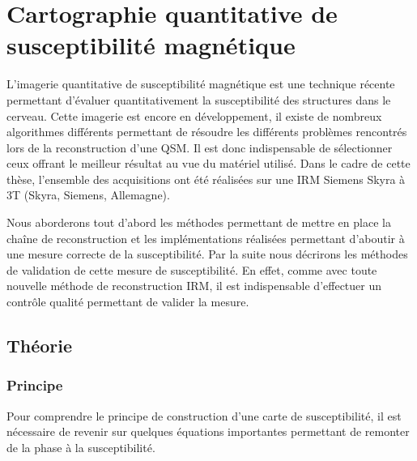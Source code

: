 
\chapter{Cartographie quantitative de susceptibilité magnétique}
\label{chap:qsm}
	\minitoc



L’imagerie quantitative de susceptibilité magnétique est une technique récente permettant
d’évaluer quantitativement la susceptibilité des structures dans le cerveau. Cette imagerie est encore
en développement, il existe de nombreux algorithmes différents permettant de résoudre les différents
problèmes rencontrés lors de la reconstruction d’une QSM. Il est donc indispensable de sélectionner
ceux offrant le meilleur résultat au vue du matériel utilisé. Dans le cadre de cette thèse, l’ensemble
des acquisitions ont été réalisées sur une IRM Siemens Skyra à 3T (Skyra, Siemens, Allemagne).

Nous aborderons tout d’abord les méthodes permettant de mettre en place la chaîne de
reconstruction et les implémentations réalisées permettant d’aboutir à une mesure correcte de la
susceptibilité. Par la suite nous décrirons les méthodes de validation de cette mesure de susceptibilité.
En effet, comme avec toute nouvelle méthode de reconstruction IRM, il est indispensable d’effectuer
un contrôle qualité permettant de valider la mesure.
\section{Théorie}
\subsection{Principe}
Pour comprendre le principe de construction d’une carte de susceptibilité, il est nécessaire de
revenir sur quelques équations importantes permettant de remonter de la phase à la susceptibilité.

